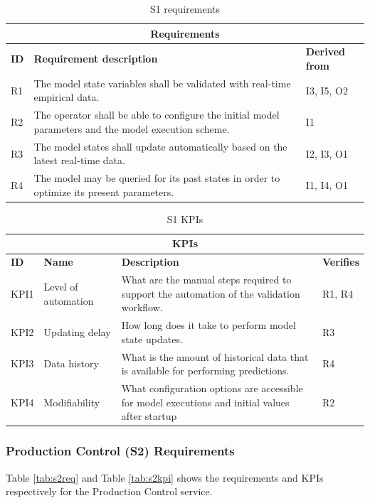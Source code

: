 \begin{table}[hbt!]
\centering
\begin{tabularx}{\textwidth}{|p{1cm}|X|p{2.5cm}|}
\hline
\multicolumn{3}{|c|}{\textbf{Requirements}} \\
\hline
\textbf{ID} & \textbf{Requirement description} & \textbf{Derived from} \\ 
\hline            
R1 & The model state variables shall be validated with real-time empirical data. & I3, I5, O2 \\ 
\hline
R2 & The operator shall be able to configure the initial model parameters and the model execution scheme. & I1 \\ 
\hline
R3 & The model states shall update automatically based on the latest real-time data. & I2, I3, O1 \\ 
\hline
R4 & The model may be queried for its past states in order to optimize its present parameters. & I1, I4, O1 \\ 
\hline
\end{tabularx}
\caption{S1 requirements}
\label{tab:s1req}
\end{table}

\begin{table}[hbt!]
\centering
\begin{tabularx}{\textwidth}{|p{1cm}|p{2.5cm}|X|p{1.5cm}|}
\hline
\multicolumn{4}{|c|}{\textbf{KPIs}} \\ 
\hline
\textbf{ID} & \textbf{Name} & \textbf{Description} & \textbf{Verifies} \\ 
\hline
KPI1 & Level of automation & What are the manual steps required to support the automation of the validation workflow. & R1, R4 \\ 
\hline
KPI2 & Updating delay & How long does it take to perform model state updates. & R3 \\ 
\hline
KPI3 & Data history & What is the amount of historical data that is available for performing predictions. & R4 \\ 
\hline
KPI4 & Modifiability & What configuration options are accessible for model executions and initial values after startup & R2 \\ 
\hline
\end{tabularx}
\caption{S1 KPIs}
\label{tab:s1kpi}
\end{table}

\subsubsection{Production Control (S2) Requirements}
Table \ref{tab:s2req} and Table \ref{tab:s2kpi} shows the requirements and KPIs respectively for the Production Control service.


